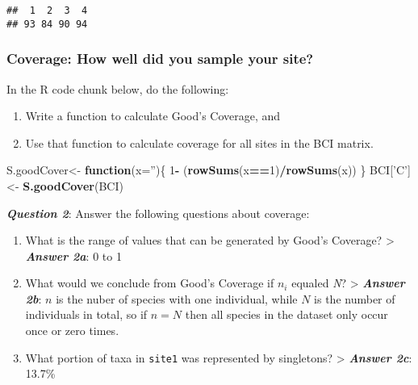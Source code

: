 \documentclass[
]{article}
\newenvironment{Shaded}{\begin{snugshade}}{\end{snugshade}}
\newcommand{\ControlFlowTok}[1]{\textcolor[rgb]{0.13,0.29,0.53}{\textbf{#1}}}
\newcommand{\DataTypeTok}[1]{\textcolor[rgb]{0.13,0.29,0.53}{#1}}
\newcommand{\DecValTok}[1]{\textcolor[rgb]{0.00,0.00,0.81}{#1}}
\newcommand{\KeywordTok}[1]{\textcolor[rgb]{0.13,0.29,0.53}{\textbf{#1}}}
\newcommand{\NormalTok}[1]{#1}
\newcommand{\OperatorTok}[1]{\textcolor[rgb]{0.81,0.36,0.00}{\textbf{#1}}}
\newcommand{\StringTok}[1]{\textcolor[rgb]{0.31,0.60,0.02}{#1}}
\begin{document}
\begin{verbatim}
##  1  2  3  4 
## 93 84 90 94
\end{verbatim}

\hypertarget{coverage-how-well-did-you-sample-your-site}{%
\subsubsection{Coverage: How well did you sample your
site?}\label{coverage-how-well-did-you-sample-your-site}}

In the R code chunk below, do the following:

\begin{enumerate}
\def\labelenumi{\arabic{enumi}.}
\item
  Write a function to calculate Good's Coverage, and
\item
  Use that function to calculate coverage for all sites in the BCI
  matrix.
\end{enumerate}

\begin{Shaded}
\begin{Highlighting}[]
\NormalTok{S.goodCover<-}\StringTok{ }\ControlFlowTok{function}\NormalTok{(}\DataTypeTok{x=}\StringTok{''}\NormalTok{)\{}
  \DecValTok{1}\OperatorTok{-}\StringTok{ }\NormalTok{(}\KeywordTok{rowSums}\NormalTok{(x}\OperatorTok{==}\DecValTok{1}\NormalTok{)}\OperatorTok{/}\KeywordTok{rowSums}\NormalTok{(x))}
\NormalTok{\}}
\NormalTok{BCI[}\StringTok{'C'}\NormalTok{] <-}\StringTok{ }\KeywordTok{S.goodCover}\NormalTok{(BCI)}
\end{Highlighting}
\end{Shaded}

\textbf{\emph{Question 2}}: Answer the following questions about
coverage:

\begin{enumerate}
\def\labelenumi{\alph{enumi}.}
\item
  What is the range of values that can be generated by Good's Coverage?
  \textgreater{} \textbf{\emph{Answer 2a}}: 0 to 1
\item
  What would we conclude from Good's Coverage if \(n_{i}\) equaled
  \emph{N}? \textgreater{} \textbf{\emph{Answer 2b}}: \(n\) is the nuber
  of species with one individual, while \(N\) is the number of
  individuals in total, so if \(n =N\) then all species in the dataset
  only occur once or zero times.
\item
  What portion of taxa in \texttt{site1} was represented by singletons?
  \textgreater{} \textbf{\emph{Answer 2c}}: 13.7\%
\end{enumerate}
\end{document}

